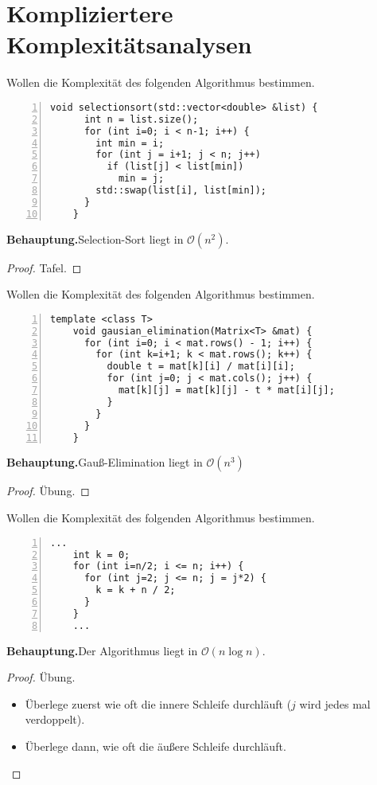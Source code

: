 \documentclass[aspectratio=169,handout]{beamer}
\begin{document}
\section{Kompliziertere Komplexitätsanalysen}

\begin{frame}[fragile]
  Wollen die Komplexität des folgenden Algorithmus bestimmen.
  \begin{lstlisting}[numbers=left]
    void selectionsort(std::vector<double> &list) {
      int n = list.size();
      for (int i=0; i < n-1; i++) {
        int min = i;
        for (int j = i+1; j < n; j++)
          if (list[j] < list[min])
            min = j;
        std::swap(list[i], list[min]);
      }
    }
  \end{lstlisting}
  \pause
  \textbf{Behauptung.}\quad Selection-Sort liegt in $\mathcal{O}(n^2)$.
  \begin{proof}
    Tafel.
  \end{proof}
\end{frame}

\begin{frame}[fragile]
  Wollen die Komplexität des folgenden Algorithmus bestimmen.
  \begin{lstlisting}[numbers=left]
    template <class T>
    void gausian_elimination(Matrix<T> &mat) {
      for (int i=0; i < mat.rows() - 1; i++) {
        for (int k=i+1; k < mat.rows(); k++) {
          double t = mat[k][i] / mat[i][i];
          for (int j=0; j < mat.cols(); j++) {
            mat[k][j] = mat[k][j] - t * mat[i][j];
          }
        }
      }
    }
  \end{lstlisting}
  \pause
  \textbf{Behauptung.}\quad Gauß-Elimination liegt in $\mathcal{O}(n^3)$
  \begin{proof}
    Übung.
  \end{proof}
\end{frame}

\begin{frame}[fragile]
  Wollen die Komplexität des folgenden Algorithmus bestimmen.
  \begin{lstlisting}[numbers=left]
    ...
    int k = 0;
    for (int i=n/2; i <= n; i++) {
      for (int j=2; j <= n; j = j*2) {
        k = k + n / 2;
      }
    }
    ...
  \end{lstlisting}
  \pause
  \textbf{Behauptung.}\quad Der Algorithmus liegt in $\mathcal{O}(n \log n)$.
  \begin{proof}
    Übung.\\
    \begin{itemize}
    \item Überlege zuerst wie oft die innere Schleife durchläuft ($j$ wird jedes mal verdoppelt).
    \item Überlege dann, wie oft die äußere Schleife durchläuft.
    \end{itemize}
  \end{proof}
\end{frame}
\end{document}
